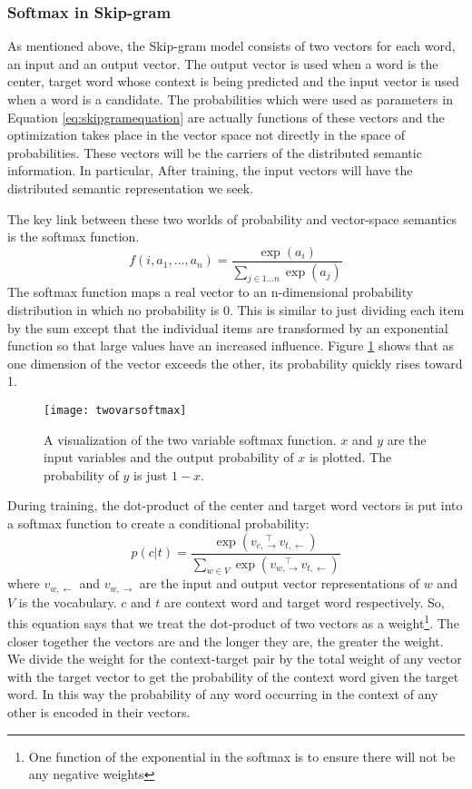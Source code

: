 \subsubsection{Softmax in Skip-gram}

As mentioned above, the Skip-gram model consists of two vectors for each word, 
an input and an output vector. The output vector is used when a word is the 
center, target word whose context is being predicted and the input vector is 
used when a word is a candidate. The probabilities which were used as parameters
in Equation \ref{eq:skipgramequation} are actually functions of these vectors
and the optimization takes place in the vector space not directly in the space
of probabilities. These vectors will be the carriers of the distributed semantic
information. In particular, After training, the input vectors will have 
the distributed semantic representation we seek. 

The key link between these two worlds of probability and vector-space semantics
is the softmax function.
%
\[f(i, a_1,\dots, a_n)=\frac{\exp\left(a_i\right)}
{\sum_{j \in 1\dots{}n}\exp\left(a_j\right)}\]
%
The softmax function maps a real vector to an n-dimensional
probability distribution in which no probability is 0. This is similar to just
dividing each item by the sum except that the individual items are transformed
by an exponential function so that large values have an increased influence.
Figure \ref{fig:twovarsoftmax} shows that as one dimension of the vector 
exceeds the other, its probability quickly rises toward 1.

\begin{figure}[tbp]
  \texttt{[image: twovarsoftmax]}
  \caption{A visualization of the two variable softmax function. $x$ and $y$
  are the input variables and the output probability of $x$ is plotted. The
  probability of $y$ is just $1-x$.}
  \label{fig:twovarsoftmax}
\end{figure}


During training, the dot-product of the center and target word vectors 
is put into a softmax function to create a conditional probability: 
%
\begin{equation}
  \label{eq:softmaxwithdotprod}
  p(c|t)=\frac{\exp\left(v_{c,\to} ^{\quad\top} v_{t,\gets}\right)}
  {\sum_{w \in V}\exp\left(v_{w,\to} ^{\quad\top} v_{t,\gets}\right)}
\end{equation}
%
where $v_{w,\gets}$ and $v_{w,\to}$ are the input and output vector 
representations of $w$ and $V$ is the vocabulary. $c$ and $t$ are context word 
and target word respectively. So, this equation says that we 
treat the dot-product of two vectors as a weight\footnote{One function of the 
exponential in the softmax is to ensure there will not be any negative 
weights}. The closer together the vectors 
are and the longer they are, the greater the weight. We divide the weight for 
the context-target pair by the total weight of any vector with the target vector
to get the probability of the context word given the target word. In this way
the probability of any word occurring in the context of any other is encoded
in their vectors.

